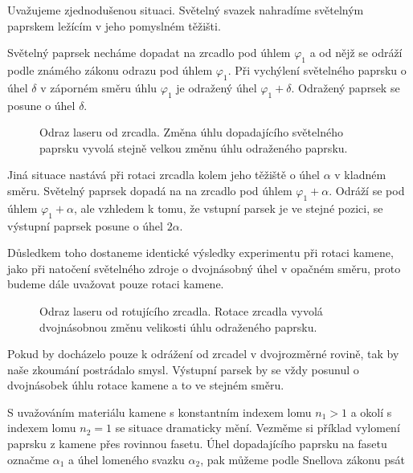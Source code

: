 Uvažujeme zjednodušenou situaci. Světelný svazek nahradíme světelným paprskem ležícím v jeho pomyslném těžišti. 

Světelný paprsek necháme dopadat na zrcadlo pod úhlem $\varphi_1$ a od nějž se odráží podle známého zákonu odrazu pod úhlem $\varphi_1$. Při vychýlení světelného paprsku o úhel $ \delta $ v záporném směru úhlu $\varphi_1$ je odražený úhel $\varphi_1 + \delta$. Odražený paprsek se posune o úhel $ \delta $.

\begin{figure}[h!]
\begin{center}
\scalebox{1}{ }
\end{center}
\caption{Odraz laseru od zrcadla. Změna úhlu dopadajícího světelného paprsku vyvolá stejně velkou změnu úhlu odraženého paprsku.}
\label{fig:odraz laser}
\end{figure}

Jiná situace nastává při rotaci zrcadla kolem jeho těžiště o úhel $\alpha$ v kladném směru. Světelný paprsek dopadá na na zrcadlo pod úhlem $\varphi_1 + \alpha$. Odráží se pod úhlem $\varphi_1+\alpha$, ale vzhledem k tomu, že vstupní parsek je ve stejné pozici, se výstupní paprsek posune o úhel  $2\alpha$. 


Důsledkem toho dostaneme identické výsledky experimentu při rotaci kamene, jako při natočení světelného zdroje o dvojnásobný úhel v opačném směru, proto budeme dále uvažovat pouze rotaci kamene. 

\newpage
\begin{figure}[h!]
\begin{center}
\scalebox{1}{ }
\end{center}
\caption{Odraz laseru od rotujícího zrcadla. Rotace zrcadla vyvolá dvojnásobnou změnu velikosti úhlu odraženého paprsku.}
\label{fig:odraz zrcadlo}
\end{figure}

Pokud by docházelo pouze k odrážení od zrcadel v dvojrozměrné rovině, tak by naše zkoumání postrádalo smysl. Výstupní parsek by se vždy posunul o dvojnásobek úhlu rotace kamene a to ve stejném směru. 

S uvažováním materiálu kamene s konstantním indexem lomu $ n_1>1 $ a okolí s indexem lomu $ n_2 = 1 $ se situace dramaticky mění. Vezměme si příklad vylomení paprsku z kamene přes rovinnou fasetu. Úhel dopadajícího paprsku na fasetu označme $\alpha_1$ a úhel lomeného svazku $\alpha_2$, pak můžeme podle Snellova zákonu psát

